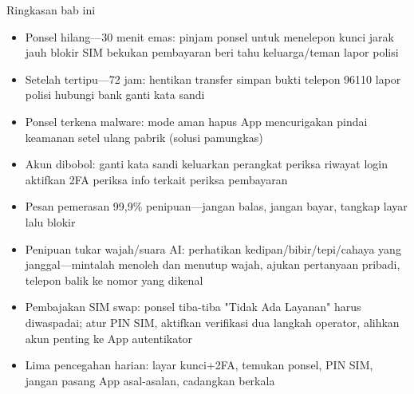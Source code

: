 \begin{tcbsummary}{Ringkasan bab ini}
\begin{itemize}
  \item Ponsel hilang—30 menit emas: pinjam ponsel untuk menelepon kunci jarak jauh blokir SIM bekukan pembayaran beri tahu keluarga/teman lapor polisi
  \item Setelah tertipu—72 jam: hentikan transfer simpan bukti telepon 96110 lapor polisi hubungi bank ganti kata sandi
  \item Ponsel terkena malware: mode aman hapus App mencurigakan pindai keamanan setel ulang pabrik (solusi pamungkas)
  \item Akun dibobol: ganti kata sandi keluarkan perangkat periksa riwayat login aktifkan 2FA periksa info terkait periksa pembayaran
  \item Pesan pemerasan 99,9\% penipuan—jangan balas, jangan bayar, tangkap layar lalu blokir
  \item Penipuan tukar wajah/suara AI: perhatikan kedipan/bibir/tepi/cahaya yang janggal—mintalah menoleh dan menutup wajah, ajukan pertanyaan pribadi, telepon balik ke nomor yang dikenal
  \item Pembajakan SIM swap: ponsel tiba-tiba "Tidak Ada Layanan" harus diwaspadai; atur PIN SIM, aktifkan verifikasi dua langkah operator, alihkan akun penting ke App autentikator
  \item Lima pencegahan harian: layar kunci+2FA, temukan ponsel, PIN SIM, jangan pasang App asal-asalan, cadangkan berkala
\end{itemize}

\end{tcbsummary}
